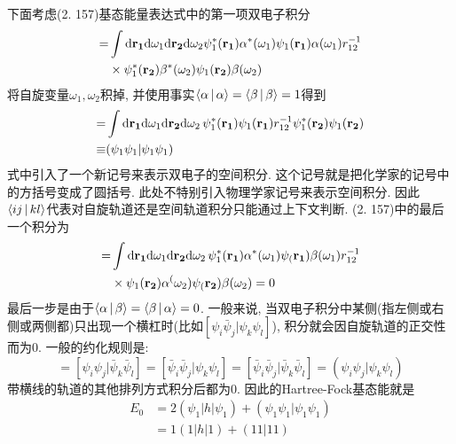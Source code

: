 下面考虑(2.
157)基态能量表达式中的第一项双电子积分
\begin{align}
[{\psi_1\psi_1|\bar{\psi}_1\bar{\psi}_1}] = & \int\dd{r_1}\dd\omega_1\dd{r_2}\dd\omega_2\psi_1^*(\mathbf{r_1})\alpha^*(\omega_1)\psi_1(\mathbf{r_1})\alpha(\omega_1) r_{12}^{-1}\notag\\
&\times \psi_1^*(\mathbf{r_2})\beta^*(\omega_2)\psi_1(\mathbf{r_2})\beta(\omega_2)
\end{align}
将自旋变量$\omega_1,\omega_2$积掉,
并使用事实$\Braket{\alpha|\alpha}=\Braket{\beta|\beta}=1$得到
\begin{align}
[{\psi_1\psi_1|\bar{\psi}_1\bar{\psi}_1}] = & \int\dd{r_1}\dd\omega_1\dd{r_2}\dd\omega_2\,\psi_1^*(\mathbf{r_1})\psi_1(\mathbf{r_1}) r_{12}^{-1}\psi_1^*(\mathbf{r_2})\psi_1(\mathbf{r_2})\notag\\
\equiv  &  (\psi_1\psi_1|\psi_1\psi_1) 
\end{align}
式中引入了一个新记号来表示双电子的空间积分. 
这个记号就是把化学家的记号中的方括号变成了圆括号. 
此处不特别引入物理学家记号来表示空间积分. 
因此$\Braket{ij|kl}$代表对自旋轨道还是空间轨道积分只能通过上下文判断. 
(2.
157)中的最后一个积分为
\begin{align}
[{\psi_1\bar{\psi}_1|\bar{\psi}_1\psi_1}] = & \int\dd{r_1}\dd\omega_1\dd{r_2}\dd\omega_2\, \psi_1^*(\mathbf{r_1})\alpha^*(\omega_1)\psi_(\mathbf{r_1})\beta(\omega_1)r_{12}^{-1}\notag\\
& \times \psi_1(\mathbf{r_2})\alpha^(\omega_2)\psi_(\mathbf{r_2})\beta(\omega_2) = 0
\end{align} 
最后一步是由于$\Braket{\alpha|\beta}=\Braket{\beta|\alpha} = 0$. 
一般来说, 
当双电子积分中某侧(指左侧或右侧或两侧都)只出现一个横杠时(比如$[\psi_i\bar{\psi}_j|\psi_k\psi_l]$), 
积分就会因自旋轨道的正交性而为0. 
一般的约化规则是:
\begin{equation}
[\psi_i\psi_j|\psi_k\psi_l] = 
[\psi_i\psi_j|\bar{\psi}_k\bar{\psi}_l] = [\bar{\psi}_i\bar{\psi}_j|\psi_k\psi_l] = [\bar{\psi}_i\bar{\psi}_j|\bar{\psi}_k\bar{\psi}_l] = (\psi_i\psi_j|\psi_k\psi_l)
\end{equation}
带横线的轨道的其他排列方式积分后都为0. 
因此的Hartree-Fock基态能就是
\begin{align}
E_0 & = 2(\psi_1|h|\psi_1) + (\psi_1\psi_1|\psi_1\psi_1)\\
    & = 1(1|h|1) + (11|11)
\end{align} 
